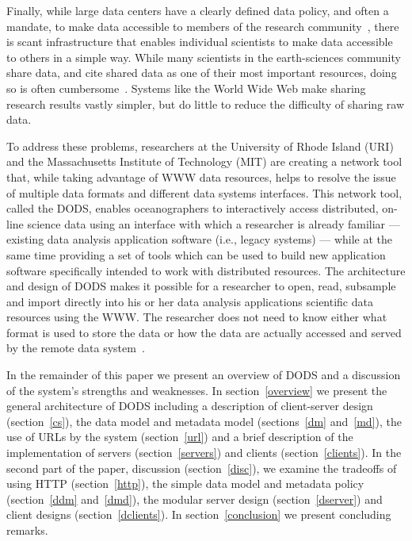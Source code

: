 \documentclass{article}
\begin{document}
Finally, while large data centers have a clearly defined data policy, and
often a mandate, to make data accessible to members of the research
community~\cite{noaa:policy}, there is scant infrastructure that enables
individual scientists to make data accessible to others in a simple way.
While many scientists in the earth-sciences community share data, and cite
shared data as one of their most important resources, doing so is often
cumbersome~\cite{dods:workshop1}. Systems like the World Wide Web make
sharing research results vastly simpler, but do little to reduce the
difficulty of sharing raw data.

To address these problems, researchers at the University of Rhode Island
(URI) and the Massachusetts Institute of Technology (MIT) are creating a
network tool that, while taking advantage of \ac{WWW} data resources, helps
to resolve the issue of multiple data formats and different data systems
interfaces.  This network tool, called the \acf{DODS}, enables oceanographers
to interactively access distributed, on-line science data using an interface
with which a researcher is already familiar --- existing data analysis
application software (i.e., legacy systems) --- while at the same time
providing a set of tools which can be used to build new application software
specifically intended to work with distributed resources.  The architecture
and design of \ac{DODS} makes it possible for a researcher to open, read,
subsample and import directly into his or her data analysis applications
scientific data resources using the \ac{WWW}.  The researcher does not need
to know either what format is used to store the data or how the data are
actually accessed and served by the remote data system~\cite{gallagher:dods}.

In the remainder of this paper we present an overview of \ac{DODS} and a
discussion of the system's strengths and weaknesses. In
section~\ref{overview} we present the general architecture of \ac{DODS}
including a description of client-server design (section~\ref{cs}), the data
model and metadata model (sections~\ref{dm} and~\ref{md}), the use of
\acs{URL}s by the system (section~\ref{url}) and a brief description of the
implementation of servers (section~\ref{servers}) and clients
(section~\ref{clients}). In the second part of the paper, discussion
(section~\ref{disc}), we examine the tradeoffs of using \acs{HTTP}
(section~\ref{http}), the simple data model and metadata policy
(section~\ref{ddm} and~\ref{dmd}), the modular server design
(section~\ref{dserver}) and client designs (section~\ref{dclients}). In
section~\ref{conclusion} we present concluding remarks.
\end{document}
